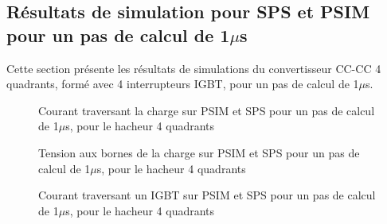 \subsection{Résultats de simulation pour SPS et PSIM pour un pas de calcul de 1$\mu$s}
Cette section présente les résultats de simulations du convertisseur CC-CC 4 quadrants, formé avec 4 interrupteurs IGBT, pour un pas de calcul de 1$\mu$s. 


\begin{figure}[htb]
\caption{Courant traversant la charge sur PSIM et SPS pour un pas de calcul de 1$\mu$s, pour le hacheur 4 quadrants}
\label{hc_cou_ch_1}
\end{figure}


\begin{figure}[htb]
\caption{Tension aux bornes de la charge sur PSIM et SPS pour un pas de calcul de 1$\mu$s, pour le hacheur 4 quadrants}
\label{hc_ten_ch_1}
\end{figure}


\begin{figure}[htb]
\caption{Courant traversant un IGBT sur PSIM et SPS pour un pas de calcul de 1$\mu$s, pour le hacheur 4 quadrants}
\label{hc_IG_cou_1}
\end{figure}

